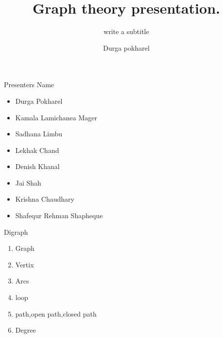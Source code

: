 \documentclass[12pt,aspectratio = 169]{beamer}
\title{\textbf Graph theory presentation.}
\subtitle{write a subtitle}
\author{Durga pokharel}
\institute{Central Department of mathematics}
\date
\begin{document}
\begin{frame}
\maketitle
\end{frame}
\begin{frame}[t]{Presenters Name}
  \begin{itemize}
   \item   Durga Pokharel 
   \item  Kamala Lamichanea Mager
   \item  Sadhana Limbu
   \item Lekhak Chand 
   \item Denish Khanal 
   \item Jai Shah
   \item  Krishna Chaudhary
   \item Shafequr Rehman Shapheque    
  


    
  \end{itemize}
\end{frame}
\begin{frame}[t]{Digraph}
 \begin{enumerate}
    \item  Graph
    \item  Vertix
    \item  Arcs
    \item  loop
    \item  path,open path,closed path
    \item  Degree
 \end{enumerate}

\end{frame}
\end{document}
